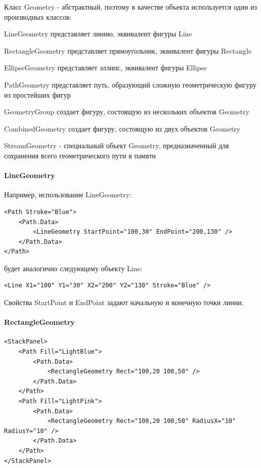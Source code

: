 Класс Geometry - абстрактный, поэтому в качестве объекта используется один из производных классов:

LineGeometry представляет линию, эквивалент фигуры Line

RectangleGeometry представляет прямоугольник, эквивалент фигуры Rectangle

EllipseGeometry представляет эллипс, эквивалент фигуры Ellipse

PathGeometry представляет путь, образующий сложную геометрическую фигуру из простейших фигур

GeometryGroup создает фигуру, состоящую из нескольких объектов Geometry

CombinedGeometry создает фигуру, состоящую из двух объектов Geometry

StreamGeometry - специальный объект Geometry, предназначенный для сохранения всего геометрического пути в памяти

\paragraph{LineGeometry}
Например, использование LineGeometry:

\begin{verbatim}
<Path Stroke="Blue">
    <Path.Data>
        <LineGeometry StartPoint="100,30" EndPoint="200,130" />
    </Path.Data>
</Path>
\end{verbatim}

будет аналогично следующему объекту Line:

\begin{verbatim}
<Line X1="100" Y1="30" X2="200" Y2="130" Stroke="Blue" />
\end{verbatim}

Свойства StartPoint и EndPoint задают начальную и конечную точки линии.

\paragraph{RectangleGeometry}

\begin{verbatim}
<StackPanel>
    <Path Fill="LightBlue">
        <Path.Data>
            <RectangleGeometry Rect="100,20 100,50" />
        </Path.Data>
    </Path>
    <Path Fill="LightPink">
        <Path.Data>
            <RectangleGeometry Rect="100,20 100,50" RadiusX="10" RadiusY="10" />
        </Path.Data>
    </Path>
</StackPanel>
\end{verbatim}


